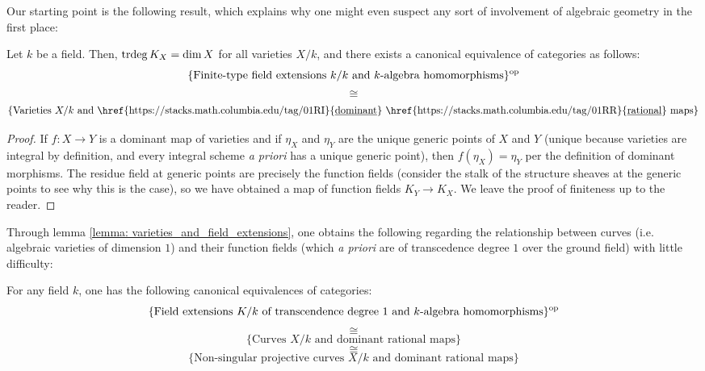             Our starting point is the following result, which explains why one might even suspect any sort of involvement of algebraic geometry in the first place:
            \begin{lemma} \label{lemma: varieties_and_field_extensions}
                \cite[\href{https://stacks.math.columbia.edu/tag/0BXN}{Tag 0BXN}]{stacks} Let $k$ be a field. Then, $\operatorname{trdeg} K_X = \dim X$ for all varieties $X/k$, and there exists a canonical equivalence of categories as follows:
                    $$\{\text{Finite-type field extensions $k/k$ and $k$-algebra homomorphisms}\}^{\mathrm{op}}$$
                    $$\cong$$
                    $$\{\text{Varieties $X/k$ and \href{https://stacks.math.columbia.edu/tag/01RI}{\underline{dominant}} \href{https://stacks.math.columbia.edu/tag/01RR}{\underline{rational}} maps}\}$$
            \end{lemma}
                \begin{proof}
                    If $f: X \to Y$ is a dominant map of varieties and if $\eta_X$ and $\eta_Y$ are the unique generic points of $X$ and $Y$ (unique because varieties are integral by definition, and every integral scheme \textit{a priori} has a unique generic point), then $f(\eta_X) = \eta_Y$ per the definition of dominant morphisms. The residue field at generic points are precisely the function fields (consider the stalk of the structure sheaves at the generic points to see why this is the case), so we have obtained a map of function fields $K_Y \to K_X$. We leave the proof of finiteness up to the reader.
                \end{proof}
            Through lemma \ref{lemma: varieties_and_field_extensions}, one obtains the following regarding the relationship between curves (i.e. algebraic varieties of dimension $1$) and their function fields (which \textit{a priori} are of transcedence degree $1$ over the ground field) with little difficulty:
            \begin{proposition} \label{prop: curves_and_function_fields}
                \cite[\href{https://stacks.math.columbia.edu/tag/0BY1}{Tag 0BY1}]{stacks} For any field $k$, one has the following canonical equivalences of categories:
                    $$\{\text{Field extensions $K/k$ of transcendence degree $1$ and $k$-algebra homomorphisms}\}^{\mathrm{op}}$$
                    $$\cong$$
                    $$\{\text{Curves $X/k$ and dominant rational maps}\}$$
                    $$\cong$$
                    $$\{\text{Non-singular projective curves $X/k$ and dominant rational maps}\}$$
            \end{proposition}

